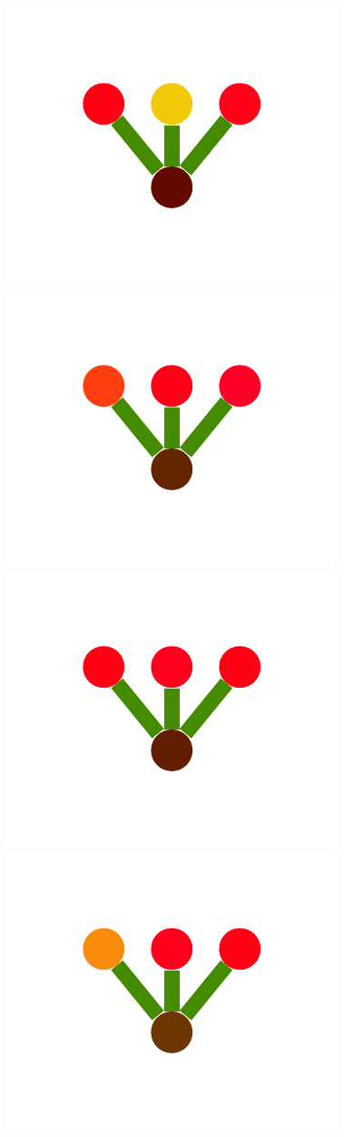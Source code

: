 \documentclass[a4paper,10pt]{article}
\begin{document}
\begin{figure}
{    \includegraphics[scale=.26]{./figures/4-2-2-mergeprog-good-5.pdf}
    \includegraphics[scale=.26]{./figures/4-2-2-mergeprog-good-6.pdf}
    \includegraphics[scale=.26]{./figures/4-2-2-mergeprog-good-7.pdf}
    \includegraphics[scale=.26]{./figures/4-2-2-mergeprog-good-8.pdf}
}
\end{figure}
\end{document}
